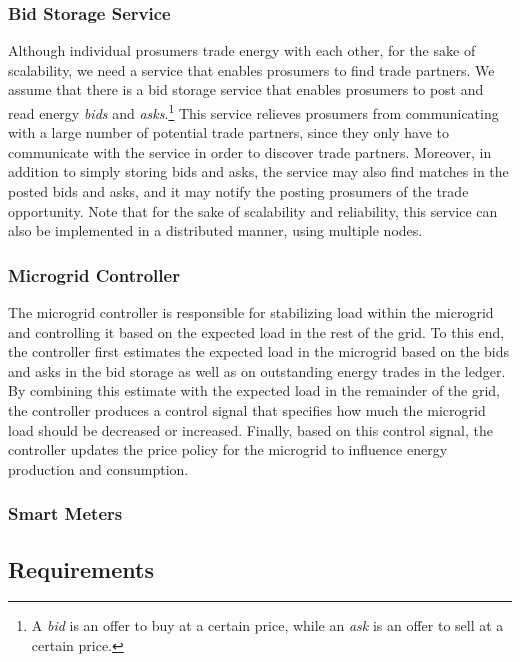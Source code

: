 \subsubsection{Bid Storage Service}
Although individual prosumers trade energy with each other, for the sake of scalability, we need a service that enables prosumers to find trade partners.
We assume that there is a bid storage service that enables prosumers to post and read energy \emph{bids} and \emph{asks}.\footnote{A \emph{bid} is an offer to buy at a certain price, while an \emph{ask} is an offer to sell at a certain price.}  
This service relieves prosumers from communicating with a large number of potential trade partners, since they only have to communicate with the service in order to discover trade partners.
Moreover, in addition to simply storing bids and asks, the service may also find matches in the posted bids and asks, and it may notify the posting prosumers of the trade opportunity.
Note that
for the sake of scalability and reliability, this service can also be implemented in a distributed manner, using multiple nodes.

\subsubsection{Microgrid Controller}
The microgrid controller is responsible for stabilizing load within the microgrid and controlling it based on the expected load in the rest of the grid.
To this end, the controller first estimates the expected load in the microgrid based on the bids and asks in the bid storage as well as on outstanding energy trades in the ledger.
By combining this estimate with the expected load in the remainder of the grid, the controller produces a control signal that specifies how much the microgrid load should be decreased or increased.
Finally, based on this control signal, the controller updates the price policy for the microgrid to influence energy production and consumption.

\subsubsection{Smart Meters}

\subsection{Requirements}

